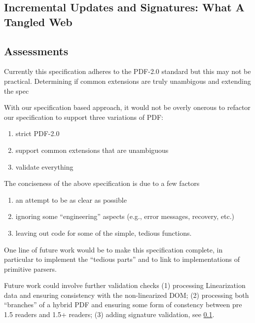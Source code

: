 \subsection{Incremental Updates and Signatures: What A Tangled Web }
\label{sec:updates-and-signatures}



\subsection{Assessments}

Currently this specification adheres to the PDF-2.0 standard but this
may not be practical.
%
Determining if common extensions are truly unambigous and extending
the spec 

With our specification based approach, it would not be overly onerous
to refactor our specification to support three variations of PDF:
\begin{enumerate}
\item strict PDF-2.0
\item support common extensions that are unambiguous
\item validate everything
\end{enumerate}

The conciseness of the above specification is due to a few factors
\begin{enumerate}
\item an attempt to be as clear as possible
\item ignoring some ``engineering'' aspects (e.g., error
   messages, recovery, etc.)
\item leaving out code for some of the simple, tedious functions.
\end{enumerate}
One line of future work would be to make this specification complete,
in particular to implement the ``tedious parts'' and to link to
implementations of primitive parsers.

Future work could involve further validation checks
(1) processing Linearization data and ensuring consistency with the
non-linearized DOM;
(2) processing both ``branches'' of a hybrid PDF and ensuring
some form of constency between pre 1.5 readers and 1.5+ readers;
(3) adding signature validation, see \cref{sec:updates-and-signatures}.
